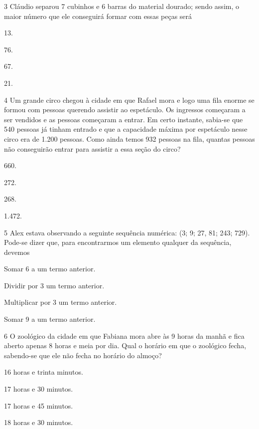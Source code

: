 \num{3} Cláudio separou 7 cubinhos e 6 barras do material dourado; sendo assim, o maior número que ele conseguirá formar com essas peças será

\begin{multicols}{2}
\begin{escolha}
\item
  13.
\item
  76.
\item
  67.
\item
  21.
\end{escolha}
\end{multicols}

\num{4} Um grande circo chegou à cidade em que Rafael mora e logo uma fila enorme se formou com pessoas querendo assistir ao espetáculo. Os ingressos começaram a ser vendidos e as pessoas começaram a entrar. Em certo instante, sabia-se que 540 pessoas já tinham entrado e que a capacidade máxima por espetáculo nesse circo era de 1.200 pessoas. Como ainda temos 932 pessoas na fila, quantas pessoas não conseguirão entrar para assistir a essa seção do circo?

\begin{multicols}{2}
\begin{escolha}
\item
  660.
\item
  272.
\item
  268.
\item
  1.472.
\end{escolha}
\end{multicols}

\num{5} Alex estava observando a seguinte sequência numérica: (3; 9; 27, 81; 243; 729).
Pode-se dizer que, para encontrarmos um elemento qualquer da sequência, devemos 

\begin{escolha}
\item
  Somar 6 a um termo anterior.
\item
  Dividir por 3 um termo anterior.
\item
  Multiplicar por 3 um termo anterior.
\item
  Somar 9 a um termo anterior.
\end{escolha}

\num{6} O zoológico da cidade em que Fabiana mora abre às 9 horas da manhã e fica aberto apenas 8 horas e meia por dia. Qual o horário em que o zoológico fecha, sabendo-se que ele não fecha no horário do almoço?

\begin{escolha}
\item
  16 horas e trinta minutos.
\item
  17 horas e 30 minutos.
\item
  17 horas e 45 minutos.
\item
  18 horas e 30 minutos.
\end{escolha}


